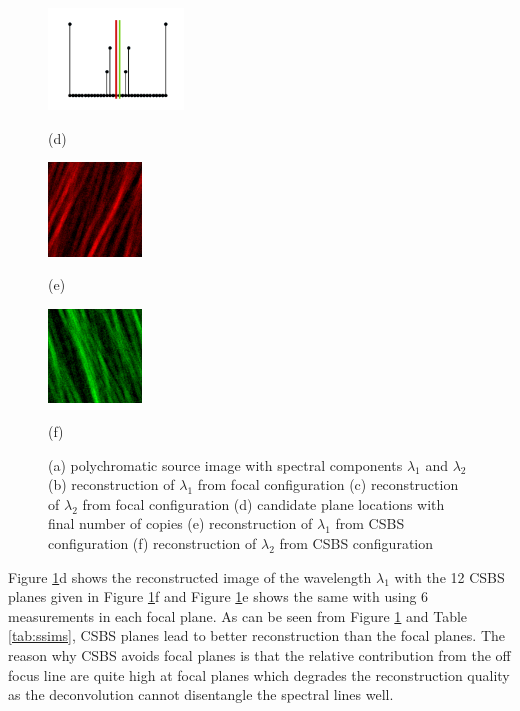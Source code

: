 \documentclass{article}
\begin{document}
\begin{figure}[t]
\begin{minipage}[b]{0.32\linewidth}
  \centering
  \centerline{\includegraphics[width=3.6cm]{csbs_copies}}
  \centerline{(d)}
\end{minipage}
\begin{minipage}[b]{0.32\linewidth}
  \centering
  \centerline{\includegraphics[width=2.5cm]{recon_csbs1}}
  \centerline{(e)}
\end{minipage}
\begin{minipage}[b]{0.32\linewidth}
  \centering
  \centerline{\includegraphics[width=2.5cm]{recon_csbs2}}
  \centerline{(f)}
\end{minipage}
\caption{(a) polychromatic source image with spectral components $\lambda_1$ and
  $\lambda_2$ (b) reconstruction of $\lambda_1$ from focal configuration (c)
  reconstruction of $\lambda_2$ from focal configuration (d) candidate plane
  locations with final number of copies (e) reconstruction of
  $\lambda_1$ from CSBS configuration (f) reconstruction of $\lambda_2$ from
  CSBS configuration}
\label{fig:results}
\end{figure}

Figure \ref{fig:results}d shows the reconstructed image of the wavelength
$\lambda_1$ with the 12 CSBS planes given in Figure \ref{fig:results}f and
Figure \ref{fig:results}e shows the same with using 6 measurements in each focal
plane. As can be seen from Figure \ref{fig:results} and Table \ref{tab:ssims},
CSBS planes lead to better reconstruction than the focal planes. The reason why
CSBS avoids focal planes is that the relative contribution from the off focus
line are quite high at focal planes which degrades the reconstruction quality
as the deconvolution cannot disentangle the spectral lines well.
\end{document}
